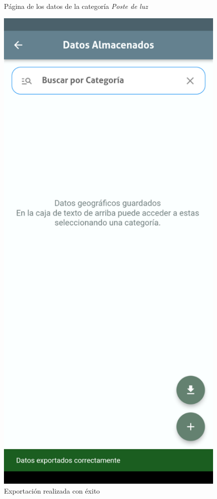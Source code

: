 \documentclass[12pt, a4paper]{book}
\begin{document}
\begin{figure}[H]
\begin{minipage}[b]{0.3\textwidth}
    \caption{Página de los datos de la categoría \textit{Poste de luz}}
    \label{fig:geodataexporter11}
  \end{minipage}
  \hspace{0.02\textwidth}
  \begin{minipage}[b]{0.3\textwidth}
    \centering
    \includegraphics[width=\textwidth]{images/functionality_test/geodata_exporter2.png}
    \caption{Exportación realizada con éxito}
    \label{fig:geodataexporter2}
  \end{minipage}
\end{figure}
\end{document}
